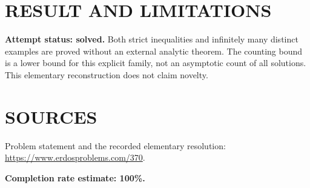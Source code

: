 \section{RESULT AND LIMITATIONS}
\textbf{Attempt status: solved.} Both strict inequalities and infinitely many distinct examples are proved without an external analytic theorem. The counting bound is a lower bound for this explicit family, not an asymptotic count of all solutions. This elementary reconstruction does not claim novelty.

\section{SOURCES}
Problem statement and the recorded elementary resolution: \url{https://www.erdosproblems.com/370}.

\textbf{Completion rate estimate: 100\%.}
